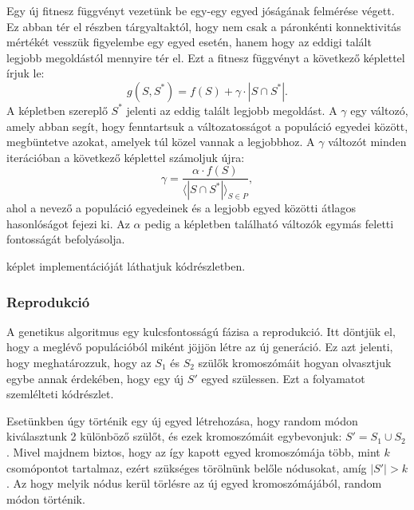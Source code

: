 Egy új fitnesz függvényt vezetünk be egy-egy egyed jóságának felmérése végett.
Ez abban tér el  részben tárgyaltaktól,
hogy nem csak a páronkénti konnektivitás mértékét vesszük figyelembe egy egyed esetén,
hanem hogy az eddigi talált legjobb megoldástól mennyire tér el.
Ezt a fitnesz függvényt a következő képlettel írjuk le:
\begin{equation}\label{eqn:SOCNDP_GA_FITNESZ_FUNCTION}
  g(S, S^{*}) = f(S) + \gamma \cdot |S \cap S^{*}|.
\end{equation}
A képletben szereplő $S^{*}$ jelenti az eddig talált legjobb megoldást.
A $\gamma$ egy változó, amely abban segít, hogy fenntartsuk a változatosságot a populáció egyedei között,
megbüntetve azokat, amelyek túl közel vannak a legjobbhoz.
A $\gamma$ változót minden iterációban a következő képlettel számoljuk újra:
\begin{equation}\label{eqn:SOCNDP_GA_GAMMA}
  \gamma = \frac{\alpha \cdot f(S)}{\langle |S \cap S^{*}| \rangle_{S \in P}},
\end{equation}
ahol a nevező a populáció egyedeinek és a legjobb egyed közötti átlagos hasonlóságot fejezi ki.
Az $\alpha$ pedig a képletben található változók egymás feletti fontosságát befolyásolja.

 képlet implementációját láthatjuk  kódrészletben.


\subsubsection{Reprodukció}
A genetikus algoritmus egy kulcsfontosságú fázisa a reprodukció.
Itt döntjük el, hogy a meglévő populációból miként jöjjön létre az új generáció.
Ez azt jelenti, hogy meghatározzuk, hogy az $S_{1}$ és $S_{2}$ szülők kromoszómáit
hogyan olvasztjuk egybe annak érdekében, hogy egy új $S'$ egyed szülessen.
Ezt a folyamatot szemlélteti  kódrészlet.


Esetünkben úgy történik egy új egyed létrehozása, hogy random módon kiválasztunk 2 különböző szülőt,
és ezek kromoszómáit egybevonjuk: $S' = S_{1} \cup S_{2}$.
Mivel majdnem biztos, hogy az így kapott egyed kromoszómája több, mint $k$ csomópontot tartalmaz,
ezért szükséges törölnünk belőle nódusokat, amíg $|S'| > k$.
Az hogy melyik nódus kerül törlésre az új egyed kromoszómájából, random módon történik.

